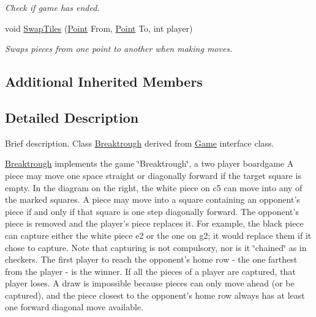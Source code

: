 \begin{DoxyCompactItemize}
\begin{DoxyCompactList}\small\item\em Check if game has ended. \end{DoxyCompactList}\item 
void \hyperlink{class_breaktrough_ae06baf0cb3f6473725075a40cd57ee37}{Swap\-Tiles} (\hyperlink{struct_point}{Point} From, \hyperlink{struct_point}{Point} To, int player)
\begin{DoxyCompactList}\small\item\em Swaps pieces from one point to another when making moves. \end{DoxyCompactList}\end{DoxyCompactItemize}
\subsection*{Additional Inherited Members}


\subsection{Detailed Description}
Brief description. Class \hyperlink{class_breaktrough}{Breaktrough} derived from \hyperlink{class_game}{Game} interface class. 

\hyperlink{class_breaktrough}{Breaktrough} implements the game \char`\"{}\-Breaktrough\char`\"{}, a two player boardgame A piece may move one space straight or diagonally forward if the target square is empty. In the diagram on the right, the white piece on c5 can move into any of the marked squares. A piece may move into a square containing an opponent's piece if and only if that square is one step diagonally forward. The opponent's piece is removed and the player's piece replaces it. For example, the black piece can capture either the white piece e2 or the one on g2; it would replace them if it chose to capture. Note that capturing is not compulsory, nor is it \char`\"{}chained\char`\"{} as in checkers. The first player to reach the opponent's home row -\/ the one farthest from the player -\/ is the winner. If all the pieces of a player are captured, that player loses. A draw is impossible because pieces can only move ahead (or be captured), and the piece closest to the opponent's home row always has at least one forward diagonal move available. 


